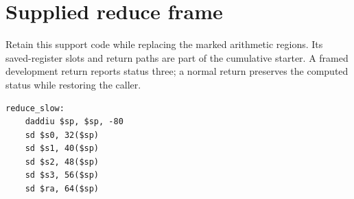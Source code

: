 \section{Supplied reduce frame}
Retain this support code while replacing the marked arithmetic regions. Its saved-register slots and return paths are part of the cumulative starter. A framed development return reports status three; a normal return preserves the computed status while restoring the caller.

\begin{verbatim}
reduce_slow:
    daddiu $sp, $sp, -80
    sd $s0, 32($sp)
    sd $s1, 40($sp)
    sd $s2, 48($sp)
    sd $s3, 56($sp)
    sd $ra, 64($sp)
\end{verbatim}
